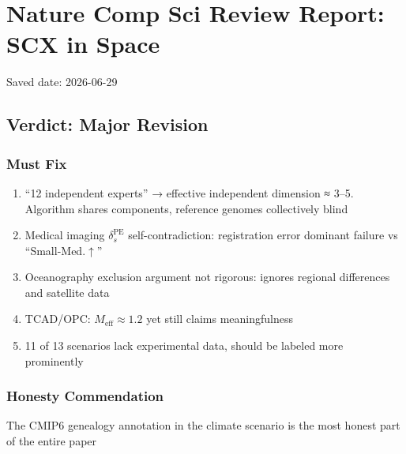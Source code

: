 \documentclass[
  12pt,
]{article}
\author{SCX}
\date{2026}
\providecommand{\tightlist}{%
  \setlength{\itemsep}{0pt}\setlength{\parskip}{0pt}}
\begin{document}
\section{Nature Comp Sci Review Report: SCX in Space}\label{nature-comp-sci-review-report-scx-in-space}

Saved date: 2026-06-29

\subsection{Verdict: Major Revision}\label{verdict-major-revision}

\subsubsection{Must Fix}\label{must-fix}

\begin{enumerate}
\def\labelenumi{\arabic{enumi}.}
\tightlist
\item
  ``12 independent experts'' → effective independent dimension ≈
  3--5. Algorithm shares components, reference genomes collectively blind
\item
  Medical imaging \(\delta_s^{\mathrm{PE}}\) self-contradiction: registration error dominant failure vs
  ``Small-Med.\(\uparrow\)''
\item
  Oceanography exclusion argument not rigorous: ignores regional differences and satellite data
\item
  TCAD/OPC: \(M_{\mathrm{eff}} \approx 1.2\) yet still claims meaningfulness
\item
  11 of 13 scenarios lack experimental data, should be labeled more prominently
\end{enumerate}

\subsubsection{Honesty Commendation}\label{honesty-commendation}

The CMIP6 genealogy annotation in the climate scenario is the most honest part of the entire paper
\end{document}
